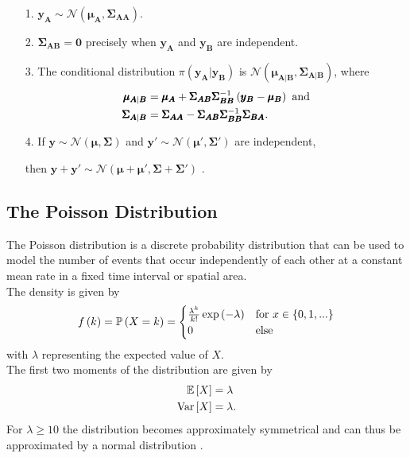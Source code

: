 \begin{itemize}
    \item[1.] $\pmb{y}_{\pmb{A}}\sim\mathcal{N}\left(\pmb{\mu}_{\pmb{A}}, \pmb{\Sigma}_{\pmb{AA}}\right)$.
    \item[2.] $\pmb{\Sigma}_{\pmb{AB}}=\pmb{0}$ precisely when $\pmb{y}_{\pmb{A}}$ and $\pmb{y}_{\pmb{B}}$ are independent.
    \item[3.] The conditional distribution $\pi\left(\pmb{y}_{\pmb{A}}|\pmb{y}_{\pmb{B}}\right)$ is $\mathcal{N}\left(\pmb{\mu}_{\pmb{A}|\pmb{B}}, \pmb{\Sigma}_{\pmb{A}|\pmb{B}}\right)$, where
    \begin{align*}
        \pmb{\mu}_{\pmb{A}|\pmb{B}} &= \pmb{\mu}_{\pmb{A}}+\pmb{\Sigma}_{\pmb{AB}}\pmb{\Sigma}_{\pmb{BB}}^{-1}\left(\pmb{y}_{\pmb{B}}-\pmb{\mu}_{\pmb{B}}\right) \hbox{ and} \\
        \pmb{\Sigma}_{\pmb{A}|\pmb{B}} &= \pmb{\Sigma}_{\pmb{AA}}-\pmb{\Sigma}_{\pmb{AB}}\pmb{\Sigma}_{\pmb{BB}}^{-1}\pmb{\Sigma}_{\pmb{BA}}.
    \end{align*}
    \item[4.] If $\pmb{y}\sim\mathcal{N}\left(\pmb{\mu}, \pmb{\Sigma}\right)$ and $\pmb{y}'\sim\mathcal{N}\left(\pmb{\mu'}, \pmb{\Sigma'}\right)$ are independent, 
    \item[]then $\pmb{y}+\pmb{y'}\sim\mathcal{N}\left(\pmb{\mu}+ \pmb{\mu'}, \pmb{\Sigma}+ \pmb{\Sigma'}\right)$ \autocite[][19--20]{rue2005gaussian}.
\end{itemize}
\subsection{The Poisson Distribution}
The Poisson distribution is a discrete probability distribution that can be used to model the number of events that occur independently of each other at a constant mean rate in a fixed time interval or spatial area. \\
The density is given by
\begin{equation}
    f\left(k\right)=\mathbb{P}\left(X=k\right)=\begin{cases}
    \frac{\lambda^k}{k!}\exp\left(-\lambda\right) & \hbox{for }x\in\left\lbrace0,1,...\right\rbrace \\
    0 & \hbox{else}
    \end{cases}
\end{equation}
with $\lambda$ representing the expected value of $X$.  \\
The first two moments of the distribution are given by
\begin{align}
    \mathbb{E}\left[X\right] &= \lambda \label{eq:poisson_exp}\\
    \hbox{Var}\left[X\right] &= \lambda \label{eq:poisson_var}.
\end{align}
For $\lambda\geq10$ the distribution becomes approximately symmetrical and can thus be approximated by a normal distribution \autocite[][243]{fahrmeir2016statistik}. \clearpage
